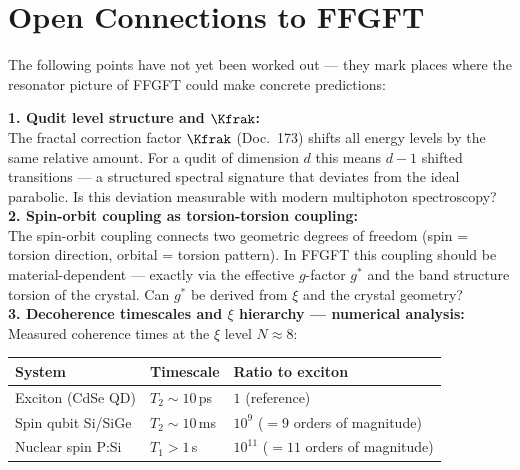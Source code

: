 \section{Open Connections to FFGFT}
\label{sec:open-connections}

The following points have not yet been worked out ---
they mark places where the resonator picture of FFGFT
could make concrete predictions:

\begin{significance}
\textbf{1. Qudit level structure and $\Kfrak$:}\\
The fractal correction factor $\Kfrak$ (Doc.~173)
shifts all energy levels by the same relative amount.
For a qudit of dimension $d$ this means
$d-1$ shifted transitions --- a structured
spectral signature that deviates from the ideal parabolic.
Is this deviation measurable with modern
multiphoton spectroscopy?\\[6pt]

\textbf{2. Spin-orbit coupling as torsion-torsion coupling:}\\
The spin-orbit coupling connects two geometric
degrees of freedom (spin = torsion direction,
orbital = torsion pattern). In FFGFT this
coupling should be material-dependent --- exactly via the
effective $g$-factor $g^*$ and the
band structure torsion of the crystal.
Can $g^*$ be derived from $\xi$ and the crystal geometry?\\[6pt]

\textbf{3. Decoherence timescales and $\xi$ hierarchy --- numerical analysis:}\\
Measured coherence times at the $\xi$ level $N \approx 8$:
\begin{center}
{\footnotesize
\begin{tabular}{lll}
\toprule
System & Timescale & Ratio to exciton \\
\midrule
Exciton (CdSe QD) & $T_2 \sim 10$\,ps & $1$ (reference) \\
Spin qubit Si/SiGe & $T_2 \sim 10$\,ms & $10^9$ ($= 9$ orders of magnitude) \\
Nuclear spin P:Si & $T_1 > 1$\,s & $10^{11}$ ($= 11$ orders of magnitude) \\
\bottomrule
\end{tabular}
} %
\end{center}


\end{significance}
